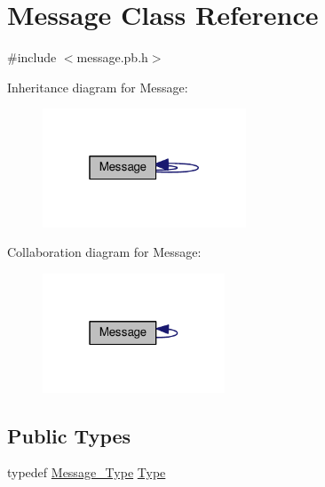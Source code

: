 \hypertarget{class_message}{}\section{Message Class Reference}
\label{class_message}


{\ttfamily \#include $<$message.\+pb.\+h$>$}



Inheritance diagram for Message\+:
\nopagebreak
\begin{figure}[H]
\begin{center}
\leavevmode
\includegraphics[width=172pt]{class_message__inherit__graph}
\end{center}
\end{figure}


Collaboration diagram for Message\+:
\nopagebreak
\begin{figure}[H]
\begin{center}
\leavevmode
\includegraphics[width=154pt]{class_message__coll__graph}
\end{center}
\end{figure}
\subsection*{Public Types}
\begin{DoxyCompactItemize}
\item 
typedef \hyperlink{message_8pb_8h_a1b620cd54f3d6b48f3c5f7979545b160}{Message\+\_\+\+Type} \hyperlink{class_message_a587bf4d6e90da72f7ba67689081e6bcb}{Type}
\end{DoxyCompactItemize}

